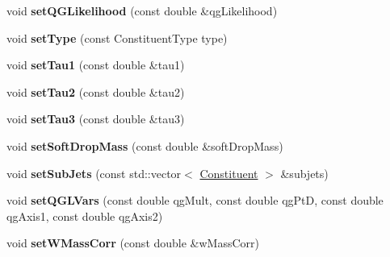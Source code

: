 \begin{DoxyCompactItemize}
\item 
\hypertarget{classConstituent_a8d08fcf43d1d33d4a09854b3a180499b}{void {\bfseries set\-Q\-G\-Likelihood} (const double \&qg\-Likelihood)}\label{classConstituent_a8d08fcf43d1d33d4a09854b3a180499b}

\item 
\hypertarget{classConstituent_addfb4fd94597fee1886d4673256d4835}{void {\bfseries set\-Type} (const Constituent\-Type type)}\label{classConstituent_addfb4fd94597fee1886d4673256d4835}

\item 
\hypertarget{classConstituent_a9d1493cc1e27c929833f5d98b73ddd88}{void {\bfseries set\-Tau1} (const double \&tau1)}\label{classConstituent_a9d1493cc1e27c929833f5d98b73ddd88}

\item 
\hypertarget{classConstituent_ae090779940f2716959ece7eacd94030d}{void {\bfseries set\-Tau2} (const double \&tau2)}\label{classConstituent_ae090779940f2716959ece7eacd94030d}

\item 
\hypertarget{classConstituent_a3e08a3c5233f6cb754404e73e25b1a8c}{void {\bfseries set\-Tau3} (const double \&tau3)}\label{classConstituent_a3e08a3c5233f6cb754404e73e25b1a8c}

\item 
\hypertarget{classConstituent_abacfdb87d076479f5a5dab8147ca2bb3}{void {\bfseries set\-Soft\-Drop\-Mass} (const double \&soft\-Drop\-Mass)}\label{classConstituent_abacfdb87d076479f5a5dab8147ca2bb3}

\item 
\hypertarget{classConstituent_a80a81bb60ea3ed312e058e46b53ff791}{void {\bfseries set\-Sub\-Jets} (const std\-::vector$<$ \hyperlink{classConstituent}{Constituent} $>$ \&subjets)}\label{classConstituent_a80a81bb60ea3ed312e058e46b53ff791}

\item 
\hypertarget{classConstituent_a934831e1872c7ac6f1e777d3069ee55a}{void {\bfseries set\-Q\-G\-L\-Vars} (const double qg\-Mult, const double qg\-Pt\-D, const double qg\-Axis1, const double qg\-Axis2)}\label{classConstituent_a934831e1872c7ac6f1e777d3069ee55a}

\item 
\hypertarget{classConstituent_ac8ce2c1a6eb317adc0d371f5ef49c726}{void {\bfseries set\-W\-Mass\-Corr} (const double \&w\-Mass\-Corr)}\label{classConstituent_ac8ce2c1a6eb317adc0d371f5ef49c726}


\end{DoxyCompactItemize}
